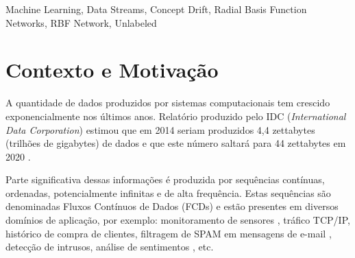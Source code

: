 \documentclass[qual, classic, a4paper]{ufbathesis}
\begin{document}
\abstract

\blindtext

\begin{keywords}
    Machine Learning, Data Streams, Concept Drift, Radial Basis Function Networks, RBF Network, Unlabeled
\end{keywords}


\tableofcontents

\listoffigures

\listoftables

\mainmatter

% 
% 
% 
%

 \label{introducao}

\section{Contexto e Motivação}

A quantidade de dados produzidos por sistemas computacionais tem crescido exponencialmente nos últimos anos.
Relatório produzido pelo IDC (\textit{International Data Corporation}) estimou que em 2014 seriam produzidos 4,4 zettabytes (trilhões de gigabytes) de dados e que este número saltará para 44 zettabytes em 2020 \cite{idc_report}.

Parte significativa dessas informações é produzida por sequências contínuas, ordenadas, potencialmente infinitas e de alta frequência.
Estas sequências são denominadas Fluxos Contínuos de Dados (FCDs) \cite{Feigenbaum:2003:ALD:589343.592594} e estão presentes em diversos domínios de aplicação, por exemplo:
monitoramento de sensores \cite{Lee:Wang:Ryu:2007},
tráfico TCP/IP, 
histórico de compra de clientes,
filtragem de SPAM em mensagens de e-mail \cite{Katakis:2010:TRC:1746286.1746291},
detecção de intrusos,
análise de sentimentos \cite{Smailovic:2014:SAL:2941772.2941857}, 
etc.
\end{document}
